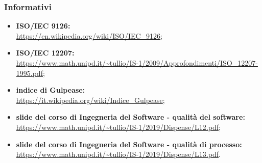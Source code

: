 		\subsubsection{Informativi}
		\begin{itemize}
			\item \textbf{ISO/IEC 9126:}\\
			\url{https://en.wikipedia.org/wiki/ISO/IEC_9126};
			\item \textbf{ISO/IEC 12207:}\\
			\url{https://www.math.unipd.it/~tullio/IS-1/2009/Approfondimenti/ISO_12207-1995.pdf};
			\item \textbf{indice di Gulpease:}\\
			\url{https://it.wikipedia.org/wiki/Indice_Gulpease};
			\item \textbf{slide del corso di Ingegneria del Software - qualità del software:}\\
			\url{https://www.math.unipd.it/~tullio/IS-1/2019/Dispense/L12.pdf};
			\item \textbf{slide del corso di Ingegneria del Software - qualità di processo:}\\
			\url{https://www.math.unipd.it/~tullio/IS-1/2019/Dispense/L13.pdf}.

		\end{itemize}
